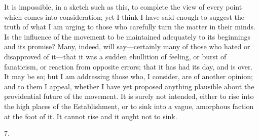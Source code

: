 It is impossible, in a sketch such as this, to complete the view of
every point which comes into consideration; yet I think I have said
enough to suggest the truth of what I am urging to those who carefully
turn the matter in their minds. Is the influence of the movement to be
maintained adequately to its beginnings and its promise? Many, indeed,
will say—certainly many of those who hated or disapproved of it—that
it was a sudden ebullition of feeling, or burst of fanaticism, or
reaction from opposite errors; that it has had its day, and is over.
It may be so; but I am addressing those who, I consider, are of
another opinion; and to them I appeal, whether I have yet proposed
anything plausible about the providential future of the movement. It
is surely not intended, either to rise into the high places of the
Establishment, or to sink into a vague, amorphous faction at the foot
of it. It cannot rise and it ought not to sink.

7.

